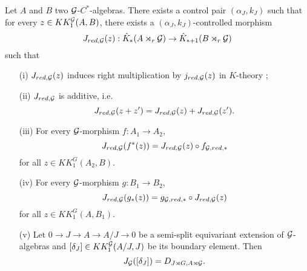\begin{prop}\label{Kasparov1}
Let $A$ and $B$ two $\mathcal G$-$C^*$-algebras. There exists a control pair $(\alpha_J,k_J)$ such that for every $z\in KK^\mathcal G_1(A,B)$, there exists a $(\alpha_J,k_J)$-controlled morphism
\[J_{red,\mathcal G}(z) : \hat K_*(A\rtimes_r \mathcal G)\rightarrow \hat K_{*+1}(B\rtimes_r \mathcal G)\]
such that
\begin{enumerate}
\item[(i)] $J_{red,\mathcal G}(z)$ induces right multiplication by $j_{red,\mathcal G}(z)$ in $K$-theory ;
\item[(ii)] $J_{red,\mathcal G}$ is additive, i.e.
\[J_{red,\mathcal G}(z+z')=J_{red,\mathcal G}(z)+J_{red,\mathcal G}(z').\]
\item[(iii)] For every $\mathcal G$-morphism $f : A_1\rightarrow A_2$,
\[J_{red,\mathcal G}(f^*(z))=J_{red,\mathcal G}(z)\circ f_{\mathcal G,red,*}\] for all $z\in KK_1^G(A_2,B)$.
\item[(iv)] For every $\mathcal G$-morphism $g : B_1\rightarrow B_2$,
\[J_{red,\mathcal G}(g_*(z))= g_{\mathcal G,red,*}\circ J_{red,\mathcal G}(z)\] for all $z\in KK_1^G(A,B_1)$.
\item[(v)] Let $0\rightarrow J\rightarrow A\rightarrow A/J\rightarrow 0$ be a semi-split equivariant extension of $\mathcal G$-algebras and $[\delta_J]\in KK_1^\mathcal G(A/J,J)$ be its boundary element. Then 
\[J_\mathcal G([\delta_J])=D_{J\rtimes G,A\rtimes\mathcal G}.\] 
\end{enumerate}
\end{prop}

